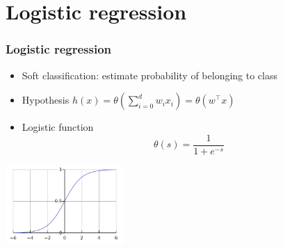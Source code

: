 \documentclass[10pt]{beamer}
\begin{document}
\section{Logistic regression}

\begin{frame}
  \frametitle{Logistic regression}
  \begin{itemize}
	\item {\color{red} Soft classification}: estimate {\color{blue} probability} of belonging to class
	\item Hypothesis $h(x)=\theta(\sum_{i=0}^d w_ix_i)=\theta(w^\top x)$
	\item {\color{green} Logistic function}
	\[\theta(s)=\frac{1}{1+e^{-s}}\]
  \end{itemize}
  \begin{center}
  \includegraphics[height=3cm]{images/sigmoid.png}
  \end{center}
\end{frame}
\end{document}
